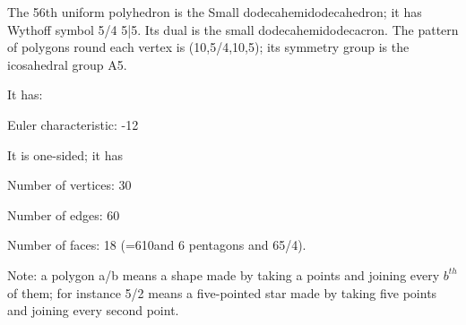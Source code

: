 The 56th uniform polyhedron is the Small dodecahemidodecahedron; it has Wythoff symbol 5/4 5|5. Its dual is the small dodecahemidodecacron. The pattern of polygons round each vertex is (10,5/4,10,5); its symmetry group is the icosahedral group A5.\par
It has:\par
Euler characteristic: -12\par
It is one-sided; it has\par
Number of vertices: 30\par
Number of edges:  60\par
Number of faces: 18 (=6{10}and 6 pentagons and 6{5/4}).\par
Note: a polygon a/b means a shape made by taking a points and joining every $b^{th}$  of them; for instance 5/2 means a five-pointed star made by taking five points and joining every second point.